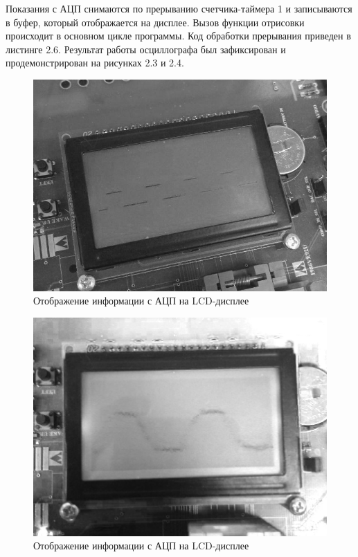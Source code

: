 \documentclass[14pt,a4paper,report]{report}
\begin{document}
Показания с АЦП снимаются по прерыванию счетчика-таймера 1 и записываются в буфер, который отображается на дисплее. Вызов функции отрисовки происходит в основном цикле программы. Код обработки прерывания приведен в листинге 2.6. Результат работы осциллографа был зафиксирован и продемонстрирован на рисунках 2.3 и 2.4.



\begin{figure}[h!]
	\centering
	\includegraphics[scale = 0.75]{img/2_3chb.png}
	\caption{Отображение информации с АЦП на LCD-дисплее}
\end{figure}

\begin{figure}[h!]
	\centering
	\includegraphics[scale = 0.65]{img/2_4.png}
	\caption{Отображение информации с АЦП на LCD-дисплее}
\end{figure}
\end{document}
